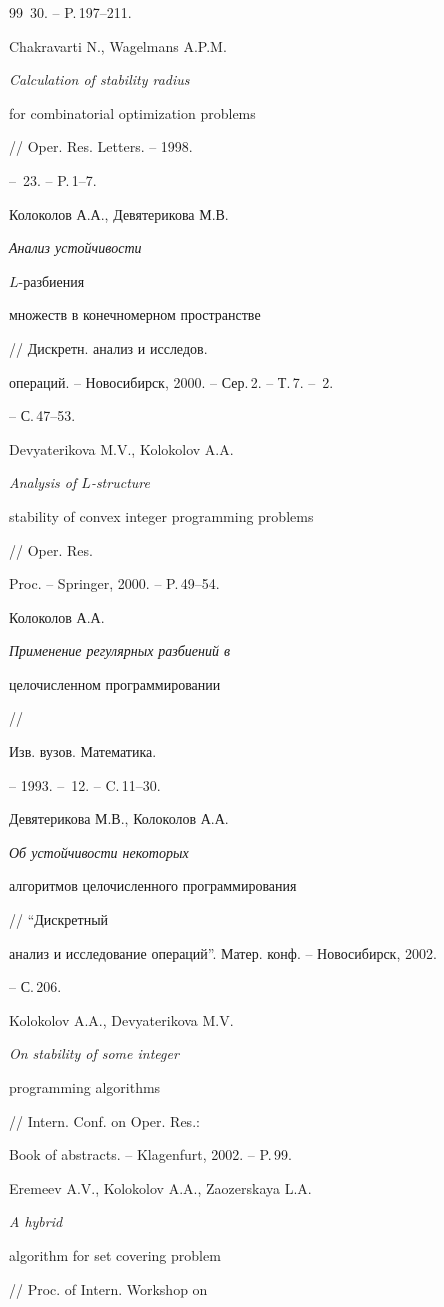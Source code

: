\begin{thebibliography}{99}
\No\,30. -- P.\,197--211.




Chakravarti N., Wagelmans A.P.M. {\em Calculation of stability  radius 


for combinatorial optimization problems} // Oper. Res. Letters. -- 1998.


-- \No\,23. -- P.\,1--7.




Колоколов А.А., Девятерикова М.В. {\em Анализ устойчивости


$L$-разбиения


множеств в конечномерном пространстве} // Дискретн. анализ и исследов. 


операций. -- Новосибирск, 2000. -- Сер.\,2. -- Т.\,7. -- \No\,2. 


-- С.\,47--53.




Devyaterikova M.V., Kolokolov A.A. {\em Analysis of $L$-structure 


stability of convex integer programming problems} // Oper. Res. 


Proc. -- Springer, 2000. -- P.\,49--54.




Колоколов А.А. {\em Применение регулярных разбиений  в


целочисленном программировании} //


Изв. вузов. Математика.


-- 1993. -- \No\,12. -- C.\,11--30. 




Девятерикова М.В., Колоколов А.А. {\em Об устойчивости некоторых 


алгоритмов целочисленного программирования} // ``Дискретный


анализ и исследование операций''. Матер. конф. -- Новосибирск, 2002.


-- С.\,206.




Kolokolov A.A., Devyaterikova M.V. {\em On  stability of some integer


programming algorithms} // Intern. Conf. on  Oper. Res.:


Book of abstracts. -- Klagenfurt, 2002. -- P.\,99.




Eremeev A.V., Kolokolov A.A., Zaozerskaya L.A. {\em A hybrid


algorithm for set covering problem} //  Proc. of Intern. Workshop on



\end{thebibliography}
